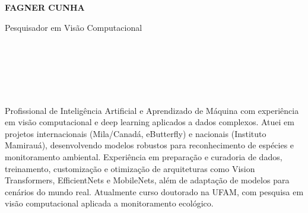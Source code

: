 \documentclass[10pt]{developercv}
\begin{document}
\begin{minipage}[t]{0.6\textwidth}
  \vspace{-\baselineskip}

  {\HUGE\textbf{\MakeUppercase{Fagner Cunha}}}
  \vspace{5pt}

  {\Large Pesquisador em Visão Computacional}

  \\

\end{minipage}
\begin{minipage}[t]{0.3\textwidth}
  \vspace{-\baselineskip}

 \\
\\ \\
\end{minipage}

\vspace{0.5cm}


\begin{minipage}[t]{\textwidth}

Profissional de Inteligência Artificial e Aprendizado de Máquina com experiência
em visão computacional e deep learning aplicados a dados complexos. Atuei em
projetos internacionais (Mila/Canadá, eButterfly) e nacionais (Instituto
Mamirauá), desenvolvendo modelos robustos para reconhecimento de espécies e
monitoramento ambiental. Experiência em preparação e curadoria de dados,
treinamento, customização e otimização de arquiteturas como Vision Transformers,
EfficientNets e MobileNets, além de adaptação de modelos para cenários do mundo
real. Atualmente curso doutorado na UFAM, com pesquisa em visão computacional
aplicada a monitoramento ecológico. \\

\end{minipage}

\end{document}
